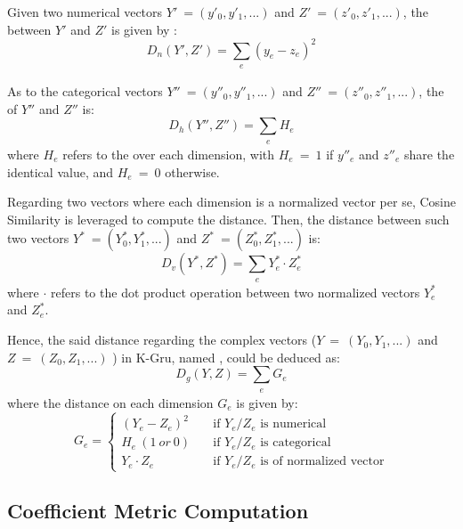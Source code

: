 Given two numerical vectors $Y'\ = (y'_0, y'_1, ...)$ and $Z'\ = (z'_0, z'_1, ...)$, the \od{}  between $Y'$ and $Z'$ is given by :
%
\begin{equation}
\label{eq:od}
D_n(Y', Z') = \sum_{\substack{e}} (y_e - z_e)^2
\end{equation}

As to the categorical vectors $Y''\ = (y''_0, y''_1, ...)$ and  $Z''\ = (z''_0, z''_1, ...)$, the \hd{}  of $Y''$ and $Z''$ is:
%
\begin{equation}
\label{eq:hd}
D_h(Y'', Z'') = \sum_{\substack{e}} H_e
\end{equation}
where $H_e$ refers to the \hd{} over each dimension, with $H_e\ =\ 1$ if $y''_e$ and $z''_e$ share the identical value, and $H_e\ =\ 0$ otherwise.

Regarding two vectors where each dimension is a normalized vector per se, Cosine Similarity  is leveraged to compute the distance.
Then, the distance between such two vectors $Y^{\ast}\ = (Y^{\ast}_0, Y^{\ast}_1, ...)$ and $Z^{\ast}\ = (Z^{\ast}_0, Z^{\ast}_1, ...)$ is:
%
\begin{equation}
\label{eq:vd}
D_v(Y^{\ast}, Z^{\ast}) = \sum_{\substack{e}} Y^{\ast}_e \cdot Z^{\ast}_e
\end{equation}
where $\cdot$ refers to the dot product operation between two normalized vectors $Y^{\ast}_e$ and $Z^{\ast}_e$.

Hence, the said distance regarding the complex vectors ($Y\ =\ (Y_0, Y_1, ...)$ and $Z\ =\ (Z_0, Z_1, ...)$ ) in K-Gru, named \gd{}, could be deduced as:
%
\begin{equation}
\label{eq:gd}
D_g(Y, Z) = \sum_{\substack{e}} G_e
\end{equation}
where the distance on each dimension $G_e$ is given by:
%
\begin{equation}
\label{eq:ge}
G_e =
  \begin{cases}
    (Y_e - Z_e)^2       & \quad \text{if } Y_e/Z_e \text{ is numerical}\\
    H_e\ (1\ or\ 0)       	& \quad \text{if } Y_e/Z_e \text{ is categorical}\\
    Y_e \cdot Z_e  		& \quad \text{if } Y_e/Z_e \text{ is of normalized vector}
  \end{cases}
\end{equation}


\subsection{Coefficient Metric Computation}
\label{sec:compu}


